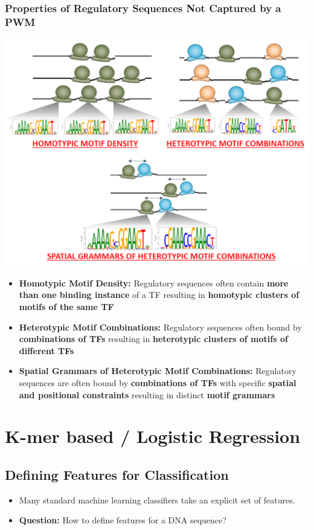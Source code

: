 \documentclass[10pt]{article}
\begin{document}
\subsubsection*{Properties of Regulatory Sequences Not Captured by a PWM}
\begin{center} 
	\includegraphics*[width=\textwidth]{W8_6.png} 
\end{center}
\begin{itemize}
	\item \textbf{Homotypic Motif Density:}  Regulatory sequences often contain \textbf{more than one binding instance} of a TF resulting in \textbf{homotypic clusters of motifs of the same TF}
	\item \textbf{Heterotypic Motif Combinations:} Regulatory sequences often bound by \textbf{combinations of TFs} resulting in \textbf{heterotypic clusters of motifs of different TFs}
	\item \textbf{Spatial Grammars of Heterotypic Motif Combinations:} Regulatory sequences are often bound by \textbf{combinations of TFs} with specific \textbf{spatial and positional constraints} resulting in distinct \textbf{motif grammars}
\end{itemize}

\section*{K-mer based / Logistic Regression}
\subsection*{Defining Features for Classification}
\begin{itemize}
	\item Many standard machine learning classifiers take an explicit set of features.
	\item \textbf{Question:} How to define features for a DNA sequence?
\end{itemize}
\end{document}

